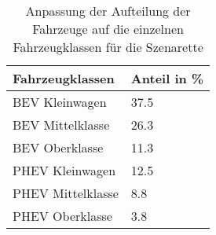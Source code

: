 {
\renewcommand{\arraystretch}{1.2}%
\begin{table}[H]
	\begin{center}
		\caption{Anpassung der Aufteilung der Fahrzeuge auf die einzelnen Fahrzeugklassen für die Szenarette}
		\begin{tabu} to 0.7\textwidth {X[1] X[1, r]}
			\hline
			Fahrzeugklassen   & Anteil in \si{\percent} \\ \hline
			BEV Kleinwagen    & \num{37.5}              \\
			BEV Mittelklasse  & \num{26.3}              \\
			BEV Oberklasse    & \num{11.3}              \\
			PHEV Kleinwagen   & \num{12.5}              \\
			PHEV Mittelklasse & \num{8.8}               \\
			PHEV Oberklasse   & \num{3.8}               \\ \hline
		\end{tabu}
		\label{tab:CarSplitSzenarette}
	\end{center}
	\vspace{-3mm}%
\end{table}
}